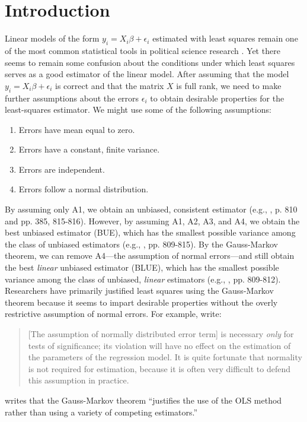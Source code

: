 \documentclass[12pt]{article}
\begin{document}

\thispagestyle{empty}

\newpage
\doublespace

\section*{Introduction}

Linear models of the form $y_i = X_i\beta + \epsilon_i$ estimated with least squares remain one of the most common statistical tools in political science research \citep{KruegerLewisBeck2008}. 
Yet there seems to remain some confusion about the conditions under which least squares serves as a good estimator of the linear model. 
After assuming that the model $y_i = X_i\beta + \epsilon_i$ is correct and that the matrix $X$ is full rank, we need to make further assumptions about the errors $\epsilon_i$ to obtain desirable properties for the least-squares estimator. We might use some of the following assumptions:
\begin{enumerate}[label= A\arabic*:]
  \item Errors have mean equal to zero.
  \item Errors have a constant, finite variance.
  \item Errors are independent.
  \item Errors follow a normal distribution.
\end{enumerate}
By assuming only A1, we obtain an unbiased, consistent estimator (e.g., \citealt{Wooldridge2013}, p. 810 and pp. 385, 815-816). 
However, by assuming A1, A2, A3, and A4, we obtain the best unbiased estimator (BUE), which has the smallest possible variance among the class of unbiased estimators (e.g., \citealt{Wooldridge2013}, pp. 809-815).
 By the Gauss-Markov theorem, we can remove A4---the assumption of normal errors---and still obtain the best \textit{linear} unbiased estimator (BLUE), which has the smallest possible variance among the class of unbiased, \textit{linear} estimators (e.g., \citealt{Wooldridge2013}, pp. 809-812). 
Researchers have primarily justified least squares using the Gauss-Markov theorem because it seems to impart desirable properties without the overly restrictive assumption of normal errors.
For example, \cite{BerryFeldman1985} write: 
\begin{quote}
[The assumption of normally distributed error term] is necessary \textit{only} for tests of significance; its violation will have no effect on the estimation of the parameters of the regression model. It is quite fortunate that normality is not required for estimation, because it is often very difficult to defend this assumption in practice.
\end{quote}
\citet[p. 101]{Wooldridge2013} writes that the Gauss-Markov theorem ``justifies the use of the OLS method rather than using a variety of competing estimators.''
\end{document}
